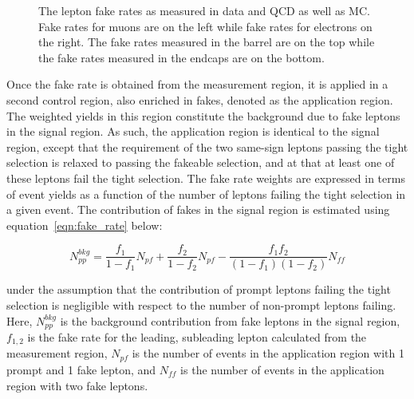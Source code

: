 \begin{figure}[htp]
\caption[Fake rate measurements in data and MC.]{The lepton fake rates as measured in data and QCD as well as \ttbar MC. Fake rates for muons are on the left while fake rates for electrons on the right. The fake rates
measured in the barrel are on the top while the fake rates measured in the endcaps are on the bottom.}
\label{fig:fakerate}
\end{figure}

Once the fake rate is obtained from the measurement region, it is applied in a second control region, also enriched in fakes, denoted as the application region. The weighted yields in this region constitute the background due to
fake leptons in the signal region. As such, the application region is identical to the signal region, except that the requirement of the two same-sign leptons passing the tight selection is relaxed to passing the fakeable selection,
and at that at least one of these leptons fail the tight selection. The fake rate weights are expressed
in terms of event yields as a function of the number of leptons failing the tight selection in a given event. The contribution of fakes in the signal region is estimated using equation~\ref{eqn:fake_rate} below:

\begin{equation}
\label{eqn:fake_rate}
  N_{pp}^{bkg} = \frac{f_{1}}{1-f_{1}}N_{pf} + \frac{f_{2}}{1-f_{2}}N_{pf} - \frac{f_{1}f_{2}}{(1-f_{1})(1-f_{2})}N_{ff}
\end{equation}

\noindent under the assumption that the contribution of prompt leptons failing the tight selection is negligible with respect to the number of non-prompt leptons failing. Here, $N_{pp}^{bkg}$ is the background contribution from fake leptons
in the signal region, $f_{1,2}$ is the fake rate for the leading, subleading lepton calculated from the measurement region, $N_{pf}$ is the number of events in the application region with 1 prompt and 1 fake lepton, and $N_{ff}$ is the
number of events in the application region with two fake leptons.

